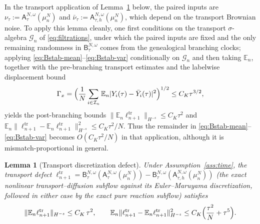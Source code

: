 \documentclass[a4paper,fleqn]{cas-sc}
\newtheorem{lemma}[theorem]{Lemma}
\theoremstyle{definition}
\theoremstyle{remark}
\begin{document}
In the transport application of Lemma~\ref{lem:transport} below, the paired
inputs are $\nu_\tau:=\mathsf A^{N,\omega}_\tau(\mu^N_n)$ and
$\bar\nu_\tau:=\mathsf A^{N,\omega}_{\tau,h}(\mu^N_n)$, which depend on the
transport Brownian noise. To apply this lemma cleanly, one first conditions on
the transport $\sigma$-algebra $\mathcal G_n$ of \eqref{eq:filtrations}, under
which the paired inputs are fixed and the only
remaining randomness in $\mathsf B^{N,\omega}_\tau$ comes from the genealogical
branching clocks; applying \eqref{eq:Bstab-mean}--\eqref{eq:Bstab-var} conditionally
on $\mathcal G_n$ and then taking $\mathbb E_n$, together with the
pre-branching transport estimates and the labelwise displacement bound
\[
\Gamma_x=\Bigl(\frac1N\sum_{i\in\mathcal I_n}\mathbb E_n|Y_i(\tau)-\bar Y_i(\tau)|^2\Bigr)^{1/2}\le C_K\tau^{3/2},
\]
yields the post-branching bounds $\|\mathbb E_n\ell^{\mathrm{tr}}_{n+1}\|_{H^{-s}}\le C_K\tau^2$
and $\mathbb E_n\|\ell^{\mathrm{tr}}_{n+1}-\mathbb E_n\ell^{\mathrm{tr}}_{n+1}\|_{H^{-s}}^2
\le C_K\tau^2/N$. Thus the remainder in
\eqref{eq:Bstab-mean}--\eqref{eq:Bstab-var} becomes $O(C_K\tau^2/N)$ in that
application, although it is mismatch-proportional in general.

\begin{lemma}[Transport discretization defect]\label{lem:transport}
Under Assumption~\ref{ass:time}, the transport defect
$\ell^{\mathrm{tr}}_{n+1}=\mathsf B^{N,\omega}_\tau(\mathsf A^{N,\omega}_\tau(\mu^N_n))
-\mathsf B^{N,\omega}_\tau(\mathsf A^{N,\omega}_{\tau,h}(\mu^N_n))$ (the exact
nonlinear transport--diffusion subflow against its Euler--Maruyama discretization,
followed in either case by the exact pure reaction subflow) satisfies
\begin{equation}\label{eq:transport}
\|\mathbb E_n\ell^{\mathrm{tr}}_{n+1}\|_{H^{-s}}\le C_K\,\tau^2,
\qquad
\mathbb E_n\|\ell^{\mathrm{tr}}_{n+1}-\mathbb E_n\ell^{\mathrm{tr}}_{n+1}\|_{H^{-s}}^2
\le C_K\Bigl(\frac{\tau^2}{N}+\tau^5\Bigr).
\end{equation}
\end{lemma}
\end{document}
